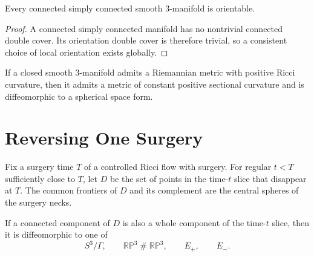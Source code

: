 \begin{lemma}
\label{lem:simply-connected-three-manifold-orientable}
\notready
Every connected simply connected smooth $3$-manifold is orientable.
\end{lemma}

\begin{proof}
A connected simply connected manifold has no nontrivial connected double
cover.  Its orientation double cover is therefore trivial, so a consistent
choice of local orientation exists globally.
\end{proof}

\begin{theorem}
\label{thm:positive-ricci-three-manifold-roundness}
\notready
If a closed smooth $3$-manifold admits a Riemannian metric with positive
Ricci curvature, then it admits a metric of constant positive sectional
curvature and is diffeomorphic to a spherical space form.
\end{theorem}

\section{Reversing One Surgery}

Fix a surgery time $T$ of a controlled Ricci flow with surgery.  For regular
$t<T$ sufficiently close to $T$, let $D$ be the set of points in the time-$t$
slice that disappear at $T$.  The common frontiers of $D$ and its complement
are the central spheres of the surgery necks.

\begin{lemma}
\label{lem:whole-disappearing-component-classification}
\notready
If a connected component of $D$ is also a whole component of the time-$t$
slice, then it is diffeomorphic to one of
\[
 S^3/\Gamma,\qquad \mathbb{RP}^3\mathbin{\#}\mathbb{RP}^3,
 \qquad E_+,
 \qquad E_-.
\]
\end{lemma}

